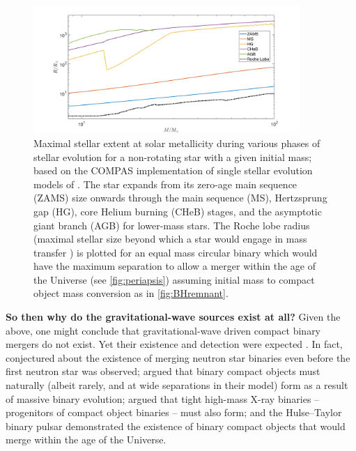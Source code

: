 \documentclass[iop,onecolumn]{revtex4}
\begin{document}
\begin{figure}
	\centering	
	\includegraphics[width=0.9\textwidth]{StellarRadiusZsolarRoche.png}
\caption{Maximal stellar extent at solar metallicity during various phases of stellar evolution for a non-rotating star with a given initial mass; based on the COMPAS implementation of single stellar evolution models of \citet{Hurley:2000}.   The star expands from its zero-age main sequence (ZAMS) size onwards through the main sequence (MS), Hertzsprung gap (HG), core Helium burning (CHeB) stages, and the asymptotic giant branch (AGB) for lower-mass stars.  The Roche lobe radius (maximal stellar size beyond which a star would engage in mass transfer \citep{Eggleton:1983}) is plotted for an equal mass circular binary which would have the maximum separation to allow a merger within the age of the Universe (see \autoref{fig:periapsis}) assuming initial mass to compact object mass conversion as in \autoref{fig:BHremnant}.\label{fig:Rmax} }
\end{figure}

\textbf{So then why do the gravitational-wave sources exist at all?} Given the above, one might conclude that gravitational-wave driven compact binary mergers do not exist. Yet their existence and detection were expected \citep{ratesdoc}. In fact, \citet{Dyson:1962} conjectured about the existence of merging neutron star binaries even before the first neutron star was observed; \citet{Tutukov:1973} argued that binary compact objects must naturally (albeit  rarely, and at wide separations in their model) form as a result of massive binary evolution; \citet{vdHDeLoore:1973} argued that tight high-mass X-ray binaries -- progenitors of compact object binaries -- must also form; and the Hulse--Taylor binary pulsar \citep{HulseTaylor:1975} demonstrated the existence of binary compact objects that would merge within the age of the Universe.
\end{document}
